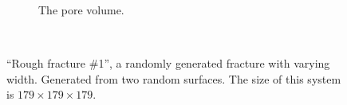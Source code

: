 \begin{figure}[!p]
{\begin{subfigure}[t]{\myfigwidth}
            \caption{The pore volume.}%
        \end{subfigure}%
    }%
    \vspace{10pt}\\%
    \caption{%
        ``Rough fracture \#1'', a randomly generated fracture with varying width. Generated from two random surfaces. The size of this system is $179 \times 179 \times 179$.%
        \label{fig:renderings_rough_fracture01_abel}%
    }%
\end{figure}%


%
\begin{figure}[!p]%
    \centering%
    \setlength{\myfigwidth}{0.55\textwidth}%
    \setlength{\myhfillwidth}{5mm}%
\end{figure}
